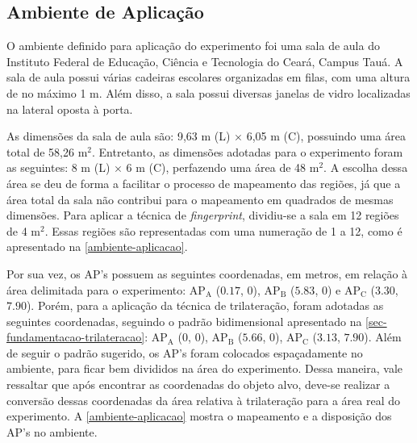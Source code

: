 \documentclass[12pt]{artigoifce}
\begin{document}
\subsection{Ambiente de Aplicação}
\label{sec-metodogolia-ambiente}

O ambiente definido para aplicação do experimento foi uma sala de aula do Instituto Federal de Educação, Ciência e Tecnologia do Ceará, Campus Tauá. A sala de aula possui várias cadeiras escolares organizadas em filas, com uma altura de no máximo 1 m. Além disso, a sala possui diversas janelas de vidro localizadas na lateral oposta à porta. 

As dimensões da sala de aula são: 9,63 m (L) $\times$ 6,05 m (C), possuindo uma área total de 58,26 m$^2$. Entretanto, as dimensões adotadas para o experimento foram as seguintes: 8 m (L) $\times$ 6 m (C), perfazendo uma área de 48 m$^2$. A escolha dessa área se deu de forma a facilitar o processo de mapeamento das regiões, já que a área total da sala não contribui para o mapeamento em quadrados de mesmas dimensões. Para aplicar a técnica de \textit{fingerprint}, dividiu-se a sala em 12 regiões de 4 m$^2$. Essas regiões são representadas com uma numeração de 1 a 12, como é apresentado na \autoref{ambiente-aplicacao}. 

Por sua vez, os AP's possuem as seguintes coordenadas, em metros, em relação à área delimitada para o experimento: AP$_\text{A}$ ($0.17$, $0$), AP$_\text{B}$ ($5.83$, $0$) e AP$_\text{C}$ ($3.30$, $7.90$). Porém, para a aplicação da técnica de trilateração, foram adotadas as seguintes coordenadas, seguindo o padrão bidimensional apresentado na \autoref{sec-fundamentacao-trilateracao}: AP$_\text{A}$ ($0$, $0$), AP$_\text{B}$ ($5.66$, $0$), AP$_\text{C}$ ($3.13$, $7.90$). Além de seguir o padrão sugerido, os AP's foram colocados espaçadamente no ambiente, para ficar bem divididos na área do experimento. Dessa maneira, vale ressaltar que após encontrar as coordenadas do objeto alvo, deve-se realizar a conversão dessas coordenadas da área relativa à trilateração para a área real do experimento. A \autoref{ambiente-aplicacao} mostra o mapeamento e a disposição dos AP's no ambiente. 
\end{document}
